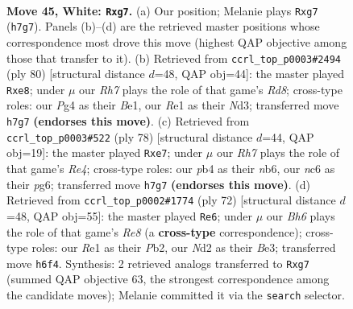 \documentclass[11pt]{article}
\begin{document}
\clearpage

\begin{figure}[p]\centering
\begin{subfigure}{0.46\textwidth}\centering
\resizebox{\linewidth}{!}{%
\newchessgame
\chessboard[
  setfen={5k2/3b2rR/2n4B/8/1p1p2P1/pP6/P1PN3K/4R3 w - - 12 45},
  showmover=false,
  pgfstyle=straightmove, color=movearrow, markmove={h7-g7}
]}
\caption{}
\end{subfigure}\hfill
\begin{subfigure}{0.46\textwidth}\centering
\resizebox{\linewidth}{!}{%
\newchessgame
\chessboard[
  setfen={3Rr3/p4k1p/5pp1/P7/4n1PP/b2N2P1/6K1/4B3 w - - 3 41},
  showmover=false,
  pgfstyle=straightmove, color=movearrow, markmove={d8-e8}
]}
\caption{}
\end{subfigure}
\\[4pt]
\begin{subfigure}{0.46\textwidth}\centering
\resizebox{\linewidth}{!}{%
\newchessgame
\chessboard[
  setfen={5k2/4r1p1/1n4p1/2p5/p1P1R3/2B2P2/PP6/6K1 w - - 3 40},
  showmover=false,
  pgfstyle=straightmove, color=movearrow, markmove={e4-e7}
]}
\caption{}
\end{subfigure}\hfill
\begin{subfigure}{0.46\textwidth}\centering
\resizebox{\linewidth}{!}{%
\newchessgame
\chessboard[
  setfen={2krRb2/5n2/pp3N2/2p3p1/8/2P1B3/1P3P2/5K2 w - - 7 37},
  showmover=false,
  pgfstyle=straightmove, color=movearrow, markmove={e8-e6}
]}
\caption{}
\end{subfigure}
\caption{\textbf{Move 45, White: \texttt{Rxg7}.} (a) Our position; Melanie plays \texttt{Rxg7} (\texttt{h7g7}). Panels (b)--(d) are the retrieved master positions whose correspondence most drove this move (highest QAP objective among those that transfer to it). (b) Retrieved from \texttt{ccrl\_top\_p0003\#2494} (ply 80) [structural distance $d$=48, QAP obj=44]: the master played \texttt{Rxe8}; under $\mu$ our \emph{Rh7} plays the role of that game's \emph{Rd8}; cross-type roles: our \emph{P}g4 as their \emph{B}e1, our \emph{R}e1 as their \emph{N}d3; transferred move \texttt{h7g7} \textbf{(endorses this move)}. (c) Retrieved from \texttt{ccrl\_top\_p0003\#522} (ply 78) [structural distance $d$=44, QAP obj=19]: the master played \texttt{Rxe7}; under $\mu$ our \emph{Rh7} plays the role of that game's \emph{Re4}; cross-type roles: our \emph{p}b4 as their \emph{n}b6, our \emph{n}c6 as their \emph{p}g6; transferred move \texttt{h7g7} \textbf{(endorses this move)}. (d) Retrieved from \texttt{ccrl\_top\_p0002\#1774} (ply 72) [structural distance $d$=48, QAP obj=55]: the master played \texttt{Re6}; under $\mu$ our \emph{Bh6} plays the role of that game's \emph{Re8} (a \textbf{cross-type} correspondence); cross-type roles: our \emph{R}e1 as their \emph{P}b2, our \emph{N}d2 as their \emph{B}e3; transferred move \texttt{h6f4}. Synthesis: 2 retrieved analogs transferred to \texttt{Rxg7} (summed QAP objective 63, the strongest correspondence among the candidate moves); Melanie committed it via the \texttt{search} selector.}
\label{fig:thought-m88}
\end{figure}
\end{document}
